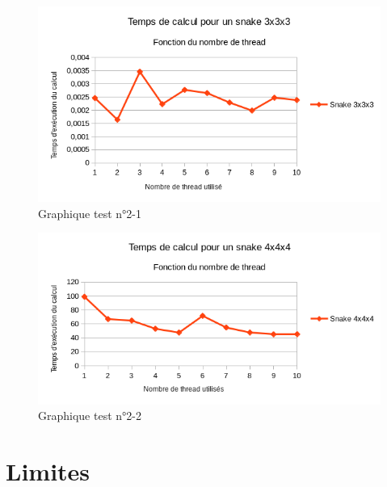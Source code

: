 \begin{figure}[h]
 \centering
 \includegraphics[scale=0.7,keepaspectratio=true]{img/test2-1.png}
 \caption{Graphique test n°2-1}
\end{figure}

\begin{figure}[h]
 \centering
 \includegraphics[scale=0.7,keepaspectratio=true]{img/test2-2.png}
 \caption{Graphique test n°2-2}
\end{figure}

\section{Limites}